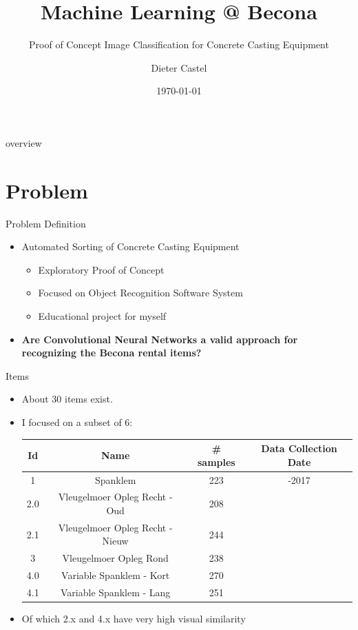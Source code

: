 \documentclass{beamer}
\title{Machine Learning @ Becona}
\subtitle{Proof of Concept Image Classification for Concrete Casting Equipment}
\author{Dieter Castel}
\date{\today}
\begin{document}
\begin{frame}
  \titlepage
\end{frame}

\begin{frame}{overview}
\tableofcontents
\end{frame}

\section{Problem}
\begin{frame}{Problem Definition}
  \begin{itemize}
	    \item Automated Sorting of Concrete Casting Equipment 
	    \begin{itemize}
	      \item Exploratory Proof of Concept 
	      \item Focused on Object Recognition Software System
	      \item Educational project for myself 
	    \end{itemize}
	    \item \textbf{Are Convolutional Neural Networks a valid approach for recognizing the Becona rental items?}
  \end{itemize}
\end{frame}

\begin{frame}{Items}
  \begin{itemize}
	    \item About 30 items exist.
	    \item I focused on a subset of 6: \\
	    \begin{tabular}{c|ccc}
	      Id & Name & \# samples & Data Collection Date\\ \hline
	      1 & Spanklem & 223 &  -2017 \\
	      2.0 & Vleugelmoer Opleg Recht - Oud& 208 \\
	      2.1 & Vleugelmoer Opleg Recht - Nieuw& 244 \\
	      3 & Vleugelmoer Opleg Rond & 238 \\
	      4.0 & Variable Spanklem - Kort & 270 \\
	      4.1 & Variable Spanklem - Lang & 251  \\
	    \end{tabular}
	    \item Of which 2.x and 4.x have very high visual similarity
  \end{itemize}
\end{frame}
\end{document}
